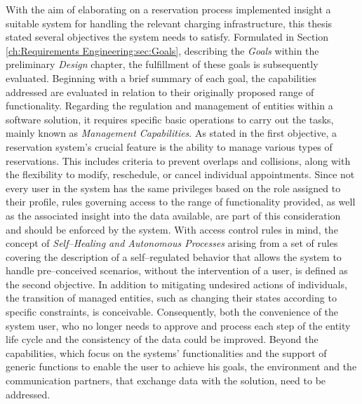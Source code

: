 With the aim of elaborating on a reservation process implemented insight a suitable system for handling the relevant charging infrastructure, this thesis stated several objectives the system needs to satisfy. 
Formulated in Section \ref{ch:Requirements Engineering:sec:Goals}, describing the \textit{Goals} within the preliminary \textit{Design} chapter, the fulfillment of these goals is subsequently evaluated.
Beginning with a brief summary of each goal, the capabilities addressed are evaluated in relation to their originally proposed range of functionality.
Regarding the regulation and management of entities within a software solution, it requires specific basic operations to carry out the tasks, mainly known as \textit{Management Capabilities}.
As stated in the first objective, a reservation system's crucial feature is the ability to manage various types of reservations. This includes criteria to prevent overlaps and collisions, along with the flexibility to modify, reschedule, or cancel individual appointments.
Since not every user in the system has the same privileges based on the role assigned to their profile, rules governing access to the range of functionality provided, as well as the associated insight into the data available, are part of this consideration and should be enforced by the system.
With access control rules in mind, the concept of \textit{Self--Healing and Autonomous Processes} arising from a set of rules covering the description of a self--regulated behavior that allows the system to handle pre--conceived scenarios, without the intervention of a user, is defined as the second objective. 
In addition to mitigating undesired actions of individuals, the transition of managed entities, such as changing their states according to specific constraints, is conceivable.
Consequently, both the convenience of the system user, who no longer needs to approve and process each step of the entity life cycle and the consistency of the data could be improved.
Beyond the capabilities, which focus on the systems' functionalities and the support of generic functions to enable the user to achieve his goals, the environment and the communication partners, that exchange data with the solution, need to be addressed.
